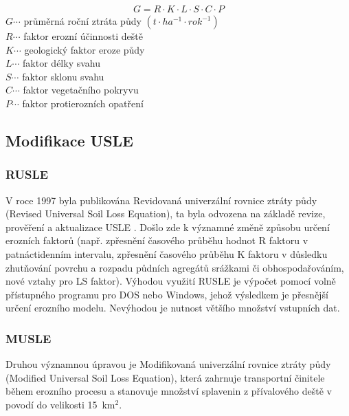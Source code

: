 \begin{align}
   \label{usle1978} G=R\cdot K\cdot L\cdot S\cdot C\cdot P
\end{align}
\hspace*{2cm}$G \cdots$ průměrná roční ztráta půdy $\left( t\cdot
ha^{-1}\cdot rok^{-1} \right)$\\
\hspace*{2cm}$R \cdots$ faktor erozní účinnosti deště \\
\hspace*{2cm}$K \cdots$ geologický faktor eroze půdy \\
\hspace*{2cm}$L \cdots$ faktor délky svahu \\
\hspace*{2cm}$S \cdots$ faktor sklonu svahu \\
\hspace*{2cm}$C \cdots$ faktor vegetačního pokryvu \\
\hspace*{2cm}$P \cdots$ faktor protierozních opatření \\

\subsection{Modifikace USLE}
\subsubsection{RUSLE}
V roce 1997 byla publikována Revidovaná univerzální rovnice ztráty
půdy (Revised Universal Soil Loss Equation), ta byla odvozena na
základě revize, prověření a aktualizace USLE  . Došlo
zde k významné změně způsobu určení erozních faktorů (např. zpřesnění
časového průběhu hodnot R faktoru v patnáctidenním intervalu,
zpřesnění časového průběhu K faktoru v důsledku zhutňování povrchu a
rozpadu půdních agregátů srážkami či obhospodařováním, nové vztahy pro
LS faktor). Výhodou využití RUSLE je výpočet pomocí volně přístupného
programu pro DOS nebo Windows, jehož výsledkem je přesnější určení
erozního modelu. Nevýhodou je nutnost většího množství vstupních
dat.\cite{rusle1997}
\subsubsection{MUSLE}
Druhou významnou úpravou je Modifikovaná univerzální rovnice ztráty
půdy (Modified Universal Soil Loss Equation), která zahrnuje
transportní činitele během erozního procesu a stanovuje množství
splavenin z přívalového deště v povodí do velikosti
15~km$^{2}$.\cite{musle1945}

